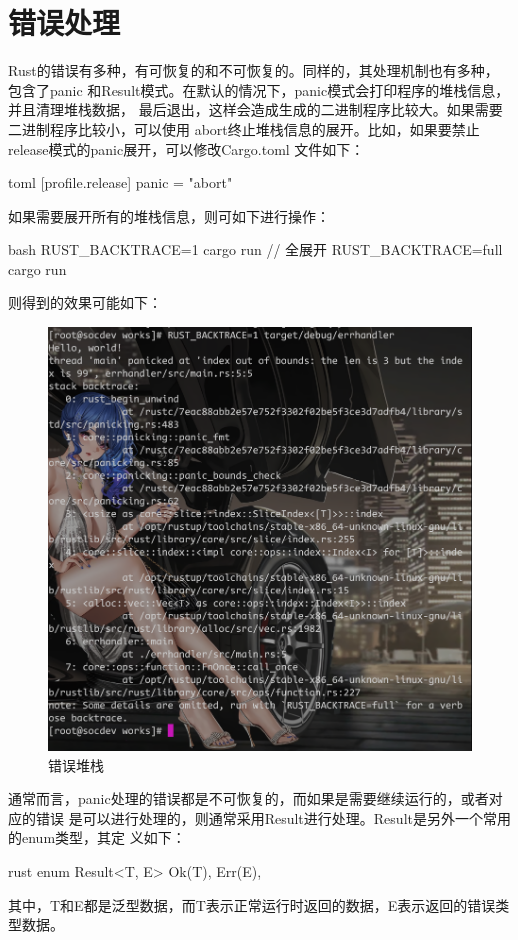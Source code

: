 \section{错误处理}
Rust的错误有多种，有可恢复的和不可恢复的。同样的，其处理机制也有多种，包含了panic
和Result模式。在默认的情况下，panic模式会打印程序的堆栈信息，并且清理堆栈数据，
最后退出，这样会造成生成的二进制程序比较大。如果需要二进制程序比较小，可以使用
abort终止堆栈信息的展开。比如，如果要禁止release模式的panic展开，可以修改Cargo.toml
文件如下：
\begin{code-block}{toml}
[profile.release]
panic = "abort"
\end{code-block}

如果需要展开所有的堆栈信息，则可如下进行操作：
\begin{code-block}{bash}
RUST_BACKTRACE=1 cargo run
// 全展开
RUST_BACKTRACE=full cargo run
\end{code-block}
则得到的效果可能如下：
\begin{figure}[H]
  \centering
  \includegraphics[scale=0.2]{rust_err_panic_trace.png}
  \caption{错误堆栈}
  \label{fig:rust_err_panic_trace}
\end{figure}

通常而言，panic处理的错误都是不可恢复的，而如果是需要继续运行的，或者对应的错误
是可以进行处理的，则通常采用Result进行处理。Result是另外一个常用的enum类型，其定
义如下：
\begin{code-block}{rust}
enum Result<T, E> {
    Ok(T),
    Err(E),
}
\end{code-block}
其中，T和E都是泛型数据，而T表示正常运行时返回的数据，E表示返回的错误类型数据。

